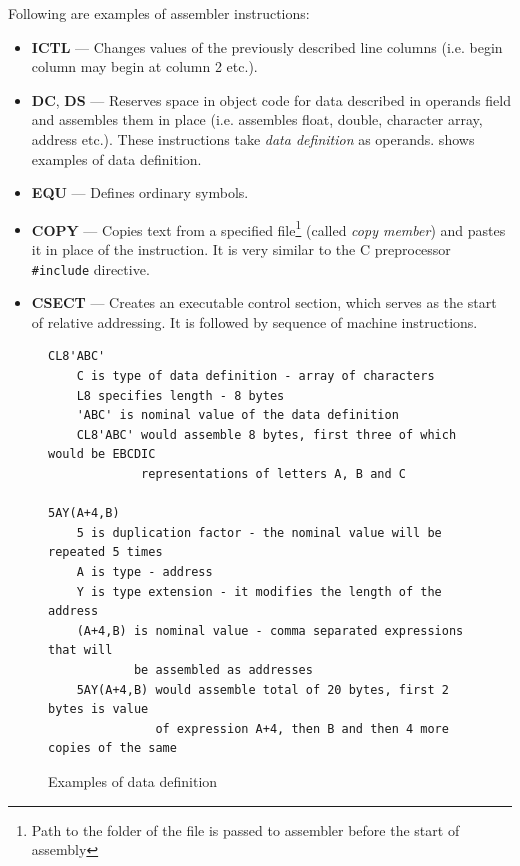 Following are examples of assembler instructions:
\begin{itemize}
	\item \textbf{ICTL} --- Changes values of the previously described line columns (i.e. begin column may begin at column 2 etc.).
	
	\item \textbf{DC}, \textbf{DS} --- Reserves space in object code for data described in operands field and assembles them in place (i.e. assembles float, double, character array, address etc.). These instructions take \emph{data definition} as operands.  shows examples of data definition.
	
	\item \textbf{EQU} --- Defines ordinary symbols.
	
	\item \textbf{COPY} --- Copies text from a specified file\footnote{Path to the folder of the file is passed to assembler before the start of assembly} (called \emph{copy member}) and pastes it in place of the instruction. It is very similar to the C preprocessor \texttt{\#include} directive.
	
	\item \textbf{CSECT} --- Creates an executable control section, which serves as the start of relative addressing. It is followed by sequence of machine instructions.
\end{itemize}

\begin{figure}[t]
	\begin{verbatim}
CL8'ABC'
    C is type of data definition - array of characters
    L8 specifies length - 8 bytes
    'ABC' is nominal value of the data definition
    CL8'ABC' would assemble 8 bytes, first three of which would be EBCDIC
             representations of letters A, B and C

5AY(A+4,B)
    5 is duplication factor - the nominal value will be repeated 5 times
    A is type - address
    Y is type extension - it modifies the length of the address
    (A+4,B) is nominal value - comma separated expressions that will
            be assembled as addresses
    5AY(A+4,B) would assemble total of 20 bytes, first 2 bytes is value
               of expression A+4, then B and then 4 more copies of the same
	\end{verbatim}
	\caption{Examples of data definition}
	\label{data_def_example}
\end{figure}


